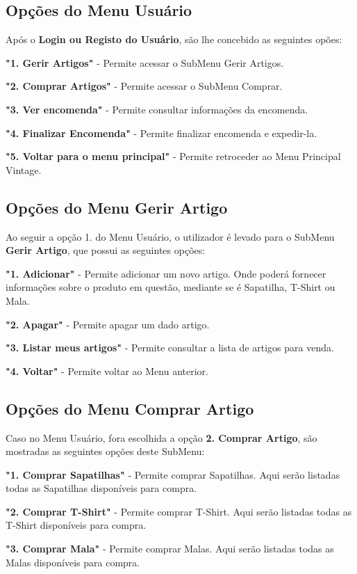 \documentclass[a4paper]{report}
\begin{document}
    \subsection{Opções do Menu Usuário}
    Após o  \textbf{Login ou Registo do Usuário}, são lhe concebido as seguintes opões:
    
    \textbf{"1. Gerir Artigos"} - Permite acessar o SubMenu Gerir Artigos.
    \par
    \textbf{"2. Comprar Artigos"} - Permite acessar o SubMenu Comprar.
    \par
    \textbf{"3. Ver encomenda"} - Permite consultar informações da encomenda.
    \par
    \textbf{"4. Finalizar Encomenda"} - Permite finalizar encomenda e expedir-la.
    \par
    \textbf{"5. Voltar para o menu principal"} - Permite retroceder ao Menu Principal Vintage.
    \par

    \subsection{Opções do Menu Gerir Artigo}
    Ao seguir a opção 1. do Menu Usuário, o utilizador é levado para o SubMenu \textbf{Gerir Artigo}, que possui as seguintes opções:

    \textbf{"1. Adicionar"} - Permite adicionar um novo artigo. Onde poderá fornecer informações sobre o produto em questão, mediante se é Sapatilha, T-Shirt ou Mala.
    \par
    \textbf{"2. Apagar"} - Permite apagar um dado artigo.
    \par
    \textbf{"3. Listar meus artigos"} - Permite consultar a lista de artigos para venda.
    \par
    \textbf{"4. Voltar"} - Permite voltar ao Menu anterior.
    \par

    \subsection{Opções do Menu Comprar Artigo}
    Caso no Menu Usuário, fora escolhida a opção \textbf{2. Comprar Artigo}, são mostradas as seguintes opções deste SubMenu:
    \par
    \textbf{"1. Comprar Sapatilhas"} - Permite comprar Sapatilhas. Aqui serão listadas todas as Sapatilhas disponíveis para compra.
    \par
    \textbf{"2. Comprar T-Shirt"} - Permite comprar T-Shirt. Aqui serão listadas todas as T-Shirt disponíveis para compra.
    \par
    \textbf{"3. Comprar Mala"} - Permite comprar Malas. Aqui serão listadas todas as Malas disponíveis para compra.
    \par
    
\end{document}

